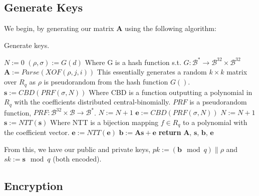 \documentclass[a4paper, 10pt]{article}
\theoremstyle{definition}
\begin{document}
\subsection{Generate Keys}
We begin, by generating our matrix $\mathbf{A}$ using the following algorithm:
\begin{algorithm}[H]
    \caption{Generate keys.}
    \begin{algorithmic}[1]
    \State $N:=0$
    \State $(\rho, \sigma ):=G(d)$ \Comment Where G is a hash function s.t. $G:\mathcal{B}^* \rightarrow \mathcal{B}^{32}\times  \mathcal{B}^{32}$
            \State $\mathbf{A}:=Parse(XOF(\rho , j, i))$ \Comment This essentially generates a random $k\times k$ matrix over $R_q$ as $\rho$ is pseudorandom from the hash function $G()$.
        \EndFor
    \EndFor
        \State $\mathbf{s}:=CBD(PRF(\sigma ,N))$ \Comment Where CBD is a function outputting a polynomial in $R_q$ with the coefficients distributed central-binomially. $PRF$ is a pseudorandom function, $PRF:\mathcal{B}^{32} \times \mathcal{B} \rightarrow \mathcal{B}^*$.
        \State $N:=N+1$
    \EndFor
        \State $\mathbf{e}:=CBD(PRF(\sigma ,N))$
        \State $N:=N+1$
    \EndFor
    \State $\mathbf{s}:= NTT(\mathbf{s})$ \Comment Where \ac{NTT} is a bijection mapping $f \in R_q$ to a polynomial with the coefficient vector.
    \State $\mathbf{e}:= NTT(\mathbf{e})$
    \State $\mathbf{b}:=\mathbf{As}+\mathbf{e}$
    \State \textbf{return} $\mathbf{A}$, $\mathbf{s}$, $\mathbf{b}$, $\mathbf{e}$
    \end{algorithmic}
\end{algorithm}

From this, we have our public and private keys, $pk:=(\mathbf{b}\mod{q})\| \rho $ and $sk:=\mathbf{s}\mod{q}$ (both encoded).

\subsection{Encryption}
\end{document}
